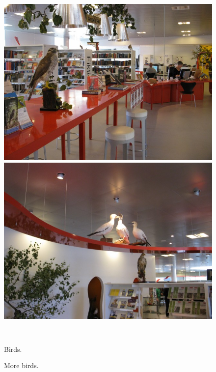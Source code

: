 \begin{figure}[htbp]\centering
	\begin{minipage}[b]{0.48\textwidth}\centering
		\includegraphics[width=1.00\textwidth]{Pictures/HjoerringLibrary/b1.jpg} %
	\end{minipage}\hfill
	\begin{minipage}[b]{0.48\textwidth}\centering
		\includegraphics[width=1.00\textwidth]{Pictures/HjoerringLibrary/b2.jpg} %
	\end{minipage}\\ %
	\begin{minipage}[t]{0.48\textwidth}
		\caption{Birds.} %
		\label{fig:b1}
	\end{minipage}\hfill
	\begin{minipage}[t]{0.48\textwidth}
		\caption{More birds.} %
		\label{fig:b2}
	\end{minipage}
\end{figure}

